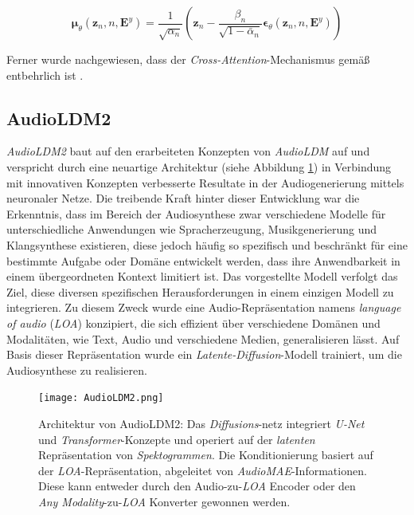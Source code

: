 \documentclass[
  a4paper,  %
  twoside,  %
  bibliography=totoc,
  headsepline,
  cleardoublepage=empty,
  parskip=half,
  draft=false
]{scrbook}
\begin{document}
\begin{equation}
    \boldsymbol{\mu}_\theta\left(\boldsymbol{z}_n, n, \boldsymbol{E}^y\right)=\frac{1}{\sqrt{\alpha_n}}\left(\boldsymbol{z}_n-\frac{\beta_n}{\sqrt{1-\bar{\alpha}_n}} \boldsymbol{\epsilon}_\theta\left(\boldsymbol{z}_n, n, \boldsymbol{E}^y\right)\right)
\end{equation}

Ferner wurde nachgewiesen, dass der \emph{Cross-Attention}-Mechanismus gemäß \cite{rombach_high-resolution_2022} entbehrlich ist \cite{liu_audioldm_2023}.

\subsection{AudioLDM2}

\emph{AudioLDM2} \cite{liu_audioldm2_2023} baut auf den erarbeiteten Konzepten von \emph{AudioLDM} \cite{liu_audioldm_2023} auf und verspricht durch eine neuartige Architektur (siehe Abbildung \ref{fig:AudioLDM2}) in Verbindung mit innovativen Konzepten verbesserte Resultate in der Audiogenerierung mittels neuronaler Netze. Die treibende Kraft hinter dieser Entwicklung war die Erkenntnis, dass im Bereich der Audiosynthese zwar verschiedene Modelle für unterschiedliche Anwendungen wie Spracherzeugung, Musikgenerierung und Klangsynthese existieren, diese jedoch häufig so spezifisch und beschränkt für eine bestimmte Aufgabe oder Domäne entwickelt werden, dass ihre Anwendbarkeit in einem übergeordneten Kontext limitiert ist. Das vorgestellte Modell verfolgt das Ziel, diese diversen spezifischen Herausforderungen in einem einzigen Modell zu integrieren. Zu diesem Zweck wurde eine Audio-Repräsentation namens \emph{language of audio} (\emph{LOA}) konzipiert, die sich effizient über verschiedene Domänen und Modalitäten, wie Text, Audio und verschiedene Medien, generalisieren lässt. Auf Basis dieser Repräsentation wurde ein \emph{Latente-Diffusion}-Modell trainiert, um die Audiosynthese zu realisieren. \cite{liu_audioldm2_2023}

\begin{figure}[h]
  \centering
  \texttt{[image: AudioLDM2.png]}
  \caption[AudioLDM2 Architektur]{Architektur von AudioLDM2: Das \emph{Diffusions}-netz integriert \emph{U-Net} und \emph{Transformer}-Konzepte und operiert auf der \emph{latenten} Repräsentation von \emph{Spektogrammen}. Die Konditionierung basiert auf der \emph{LOA}-Repräsentation, abgeleitet von \emph{AudioMAE}-Informationen. Diese kann entweder durch den Audio-zu-\emph{LOA} Encoder oder den \emph{Any Modality}-zu-\emph{LOA} Konverter gewonnen werden. \cite{liu_audioldm2_2023}}
  \label{fig:AudioLDM2}
\end{figure} 
\end{document}
